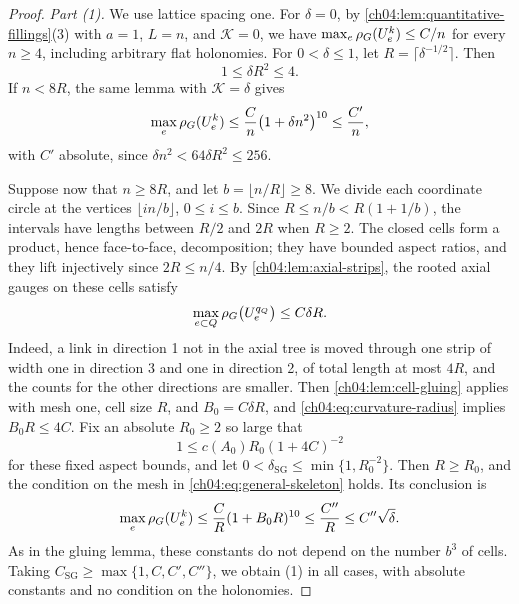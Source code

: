 \begin{proof}
\emph{Part (1).} We use lattice spacing one. For $\delta=0$, by \cref{ch04:lem:quantitative-fillings}(3) with $a=1$, $L=n$, and $\mathscr K=0$, we have $\max_e\rho_G(U^k_e)\le C/n$ for every $n\ge4$, including arbitrary flat holonomies. For $0<\delta\le1$, let $R=\lceil\delta^{-1/2}\rceil$. Then
\begin{equation}\label{ch04:eq:curvature-radius}
 1\le\delta R^2\le4.
\end{equation}
If $n<8R$, the same lemma with $\mathscr K=\delta$ gives
\[
 \max_e\rho_G(U^k_e)\le\frac Cn\bigl(1+\delta n^2\bigr)^{10}\le\frac{C'}n,
\]
with $C'$ absolute, since $\delta n^2<64\delta R^2\le256$.

Suppose now that $n\ge8R$, and let $b=\lfloor n/R\rfloor\ge8$. We divide each coordinate circle at the vertices $\lfloor in/b\rfloor$, $0\le i\le b$. Since $R\le n/b<R(1+1/b)$, the intervals have lengths between $R/2$ and $2R$ when $R\ge2$. The closed cells form a product, hence face-to-face, decomposition; they have bounded aspect ratios, and they lift injectively since $2R\le n/4$. By \cref{ch04:lem:axial-strips}, the rooted axial gauges on these cells satisfy
\[
 \max_{e\subset Q}\rho_G\bigl(U^{q_Q}_e\bigr)\le C\delta R.
\]
Indeed, a link in direction 1 not in the axial tree is moved through one strip of width one in direction 3 and one in direction 2, of total length at most $4R$, and the counts for the other directions are smaller. Then \cref{ch04:lem:cell-gluing} applies with mesh one, cell size $R$, and $B_0=C\delta R$, and \eqref{ch04:eq:curvature-radius} implies $B_0R\le4C$. Fix an absolute $R_0\ge2$ so large that
\[
 1\le c(A_0)R_0(1+4C)^{-2}
\]
for these fixed aspect bounds, and let $0<\delta_{\mathrm{SG}}\le\min\{1,R_0^{-2}\}$. Then $R\ge R_0$, and the condition on the mesh in \eqref{ch04:eq:general-skeleton} holds. Its conclusion is
\[
 \max_e\rho_G(U^k_e)\le\frac CR(1+B_0R)^{10}\le\frac{C''}R\le C''\sqrt\delta.
\]
As in the gluing lemma, these constants do not depend on the number $b^3$ of cells. Taking $C_{\mathrm{SG}}\ge\max\{1,C,C',C''\}$, we obtain (1) in all cases, with absolute constants and no condition on the holonomies.


\end{proof}
